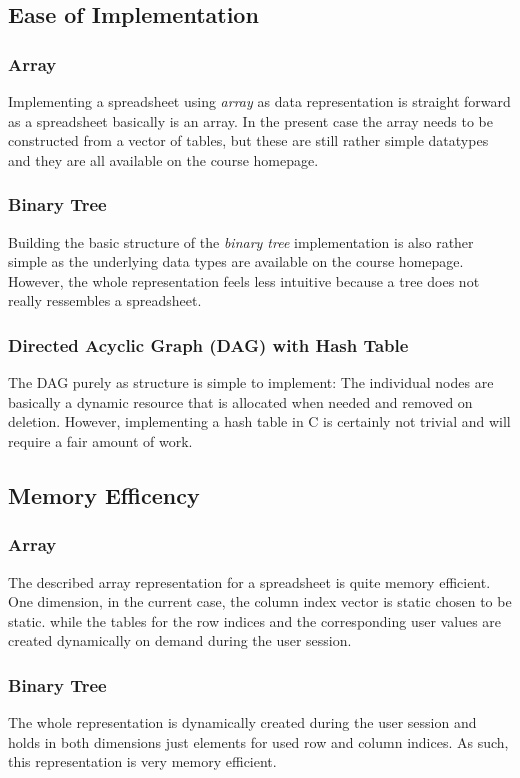 \documentclass[a4paper,11pt,twoside]{article}
\begin{document}
\subsection{Ease of Implementation}
\subsubsection{Array}
Implementing a spreadsheet using \textit{array} as data representation
is straight forward as a spreadsheet basically is an array. In the
present case the array needs to be constructed from a vector of
tables, but these are still rather simple datatypes and they are all
available on the course homepage.



\subsubsection{Binary Tree}
Building the basic structure of the \textit{binary tree}
implementation is also rather simple as the underlying data
types are available on the course homepage. However, the whole
representation feels less intuitive because a tree does not really
ressembles a spreadsheet.



\subsubsection{Directed Acyclic Graph (DAG) with Hash Table}
The DAG purely as structure is simple to implement: The individual
nodes are basically a dynamic resource that is allocated when needed
and removed on deletion. However, implementing a hash table in C is
certainly not trivial and will require a fair amount of work. 

\subsection{Memory Efficency}
\subsubsection{Array}
The described array representation for a spreadsheet is quite memory
efficient. One dimension, in the current case, the column index vector
is static chosen to be static. while the tables for the row indices
and the corresponding user values are created dynamically on demand
during the user session.  

\subsubsection{Binary Tree}
The whole representation is dynamically created during the user
session and holds in both dimensions just elements for used row and
column indices. As such, this representation is very memory efficient.
\end{document}
